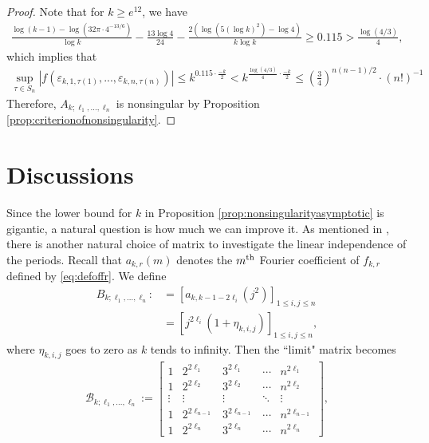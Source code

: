 \documentclass[11pt,letterpaper,reqno]{amsart}
\newcommand\ques[1]{\textcolor{blue}{\textbf{Question}: #1}}
\numberwithin{figure}{section}
\numberwithin{table}{section}
\theoremstyle{definition}
\theoremstyle{plain}
\theoremstyle{definition}
\theoremstyle{definition}
\theoremstyle{remark}
\numberwithin{equation}{section}
\theoremstyle{remark}
\begin{document}
\begin{proof}
    Note that for $k\geq e^{12}$, we have
    \begin{align}
        \frac{\log(k-1)-\log(32\pi\cdot4^{-13/6})}{\log k}-\frac{13\log4}{24}-\frac{2(\log(5(\log k)^2)-\log4)}{k\log k}\geq 0.115>\frac{\log(4/3)}{4},
    \end{align}
    which implies that 
     \begin{align} \sup_{\tau\in S_n}|f(\varepsilon_{k,1,\tau(1)},...,\varepsilon_{k,n,\tau(n)})|\leq k^{0.115\cdot\frac{-k}{2}}<k^{\frac{\log(4/3)}{4}\cdot\frac{-k}{2}}\leq    \left(\frac{3}{4}\right)^{n(n-1)/2}\cdot(n!)^{-1}\end{align}
Therefore, $A_{k;\ell_1,...,\ell_n}$ is nonsingular by Proposition \ref{prop:criterionofnonsingularity}.
  \end{proof}
  \section{Discussions}\label{sect:discussion}
Since the lower bound for $k$ in Proposition \ref{prop:nonsingularityasymptotic} is gigantic, a natural question is how much we can improve it. 
As mentioned in \cite[Remark 2.9]{oddperiods}, there is another natural choice of matrix to investigate the linear independence of the periods. Recall that $a_{k,r}(m)$ denotes the $m^{{\rm th}}$ Fourier coefficient of $f_{k,r}$ defined by \eqref{eq:defoffr}. We define
 \begin{align}
    B_{k;\ell_1,...,\ell_n}:&=\left[a_{k,k-1-2\ell_i}(j^2)\right]_{1\leq i,j\leq n}\\&=
\left[j^{2\ell_i}(1+\eta_{k,i,j})\right]_{1\leq i,j\leq n},  
\end{align}
where $\eta_{k,i,j}$ goes to zero as $k$ tends to infinity. 
Then the ``limit" matrix becomes
\begin{align}
    \mathscr{B}_{k;\ell_1,...,\ell_n}:=\begin{bmatrix}
        1 & 2^{2\ell_1} & 3^{2\ell_1} & \cdots & n^{2\ell_1}\\
        1 & 2^{2\ell_2} & 3^{2\ell_2} & \cdots & n^{2\ell_2}\\
        \vdots & \vdots & \vdots & \ddots & \vdots\\
        1 & 2^{2\ell_{n-1}} & 3^{2\ell_{n-1}} & \cdots & n^{2\ell_{n-1}}\\ 
        1 & 2^{2\ell_n} & 3^{2\ell_n} & \cdots & n^{2\ell_n}
    \end{bmatrix},\label{eq:generalizaedVandermonde}
\end{align}
\end{document}

